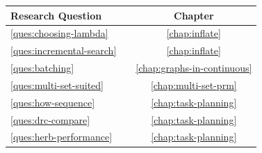 \documentclass{report}
\begin{document}
\begin{center}
\begin{tabular}{llc}
\toprule
   \multicolumn{2}{l}{Research Question}
      & Chapter \\
\midrule
   \ref{ques:choosing-lambda}
      &
      \begin{minipage}[c]{0.8\columnwidth}%
      \nameref{ques:choosing-lambda}
      \end{minipage}%
      & \ref{chap:inflate} \\[10pt]
   \ref{ques:incremental-search}
      &
      \begin{minipage}[c]{0.8\columnwidth}%
      \nameref{ques:incremental-search}
      \end{minipage}%
      & \ref{chap:inflate} \\[10pt]
   \ref{ques:batching}
      &
      \begin{minipage}[c]{0.8\columnwidth}%
      \nameref{ques:batching}
      \end{minipage}%
      & \ref{chap:graphs-in-continuous} \\[10pt]
   \ref{ques:multi-set-suited}
      &
      \begin{minipage}[c]{0.8\columnwidth}%
      \nameref{ques:multi-set-suited}
      \end{minipage}%
      & \ref{chap:multi-set-prm} \\[10pt]
   \ref{ques:how-sequence}
      &
      \begin{minipage}[c]{0.8\columnwidth}%
      \nameref{ques:how-sequence}
      \end{minipage}%
      & \ref{chap:task-planning} \\[10pt]
   \ref{ques:drc-compare}
      &
      \begin{minipage}[c]{0.8\columnwidth}%
      \nameref{ques:drc-compare}
      \end{minipage}%
      & \ref{chap:task-planning} \\[10pt]
   \ref{ques:herb-performance}
      &
      \begin{minipage}[c]{0.8\columnwidth}%
      \nameref{ques:herb-performance}
      \end{minipage}%
      & \ref{chap:task-planning} \\[6pt]
\bottomrule
\end{tabular}
\end{center}
\end{document}
